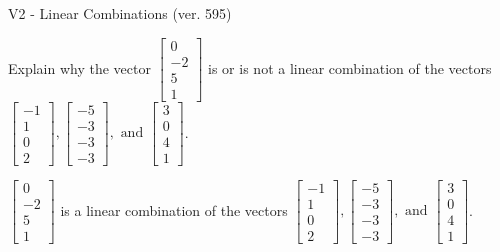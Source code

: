 \begin{exercise}
  \begin{exerciseTitle}V2 - Linear Combinations (ver. 595)\end{exerciseTitle}
  \begin{exerciseStatement}
    Explain why the vector \(\left[\begin{array}{c}
0 \\
-2 \\
5 \\
1
\end{array}\right]\)  is or is not a linear 
	combination of the vectors \(\left[\begin{array}{c}
-1 \\
1 \\
0 \\
2
\end{array}\right] , \left[\begin{array}{c}
-5 \\
-3 \\
-3 \\
-3
\end{array}\right] , \text{ and } \left[\begin{array}{c}
3 \\
0 \\
4 \\
1
\end{array}\right]\).
	


  \end{exerciseStatement}
  \begin{exerciseAnswer}
   \(\left[\begin{array}{c}
0 \\
-2 \\
5 \\
1
\end{array}\right]\) 
  	 is  
	a linear combination of the vectors \(\left[\begin{array}{c}
-1 \\
1 \\
0 \\
2
\end{array}\right] , \left[\begin{array}{c}
-5 \\
-3 \\
-3 \\
-3
\end{array}\right] , \text{ and } \left[\begin{array}{c}
3 \\
0 \\
4 \\
1
\end{array}\right]\).

	
  


  \end{exerciseAnswer}
\end{exercise}